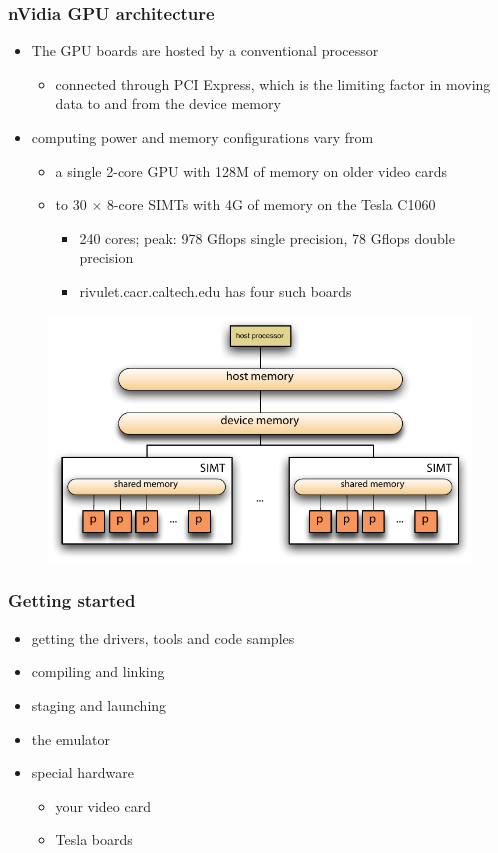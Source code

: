 \begin{frame}[fragile]
%
  \frametitle{nVidia GPU architecture}
%
  \begin{itemize}
  \item The GPU boards are hosted by a conventional processor
    \begin{itemize}
    \item connected through PCI Express, which is the limiting factor in moving data to and
      from the device memory
    \end{itemize}
  \item computing power and memory configurations vary from
    \begin{itemize}
    \item a single 2-core GPU with 128M of memory on older video cards
    \item to 30 $\times$ 8-core SIMTs with 4G of memory on the Tesla C1060
      \begin{itemize}
      \item 240 cores; peak: 978 Gflops single precision, 78 Gflops double precision
      \item rivulet.cacr.caltech.edu has four such boards
      \end{itemize}
    \end{itemize}
  \end{itemize}  
  
%
  \begin{figure}
    \centering
    \includegraphics[width=0.75\linewidth]{figures/cuda-architecture.pdf}
    \label{fig:simd}
  \end{figure}
%
\end{frame}

\begin{frame}[fragile]
%
  \frametitle{Getting started}
%
  \begin{itemize}
%
  \item getting the drivers, tools and code samples
%
  \item compiling and linking
%
  \item staging and launching
%
  \item the emulator
%
  \item special hardware
    \begin{itemize}
    \item your video card
    \item Tesla boards
    \end{itemize}
%
  \end{itemize}
%
\end{frame}

